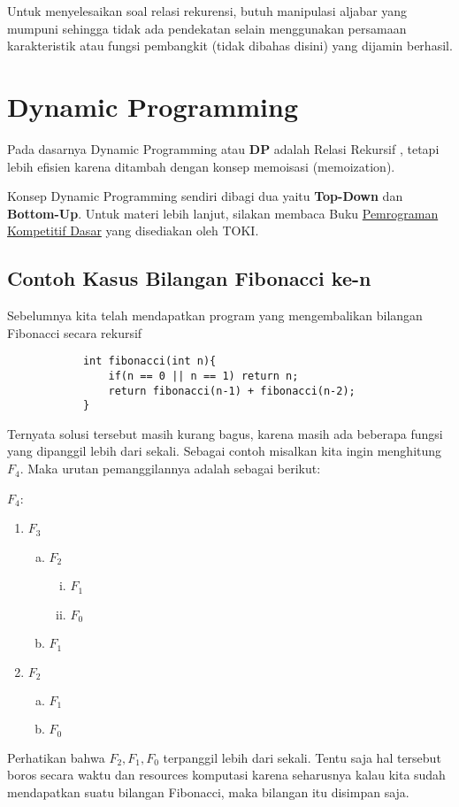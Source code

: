 \documentclass[11pt]{scrartcl}
\begin{document}
		    
		    Untuk menyelesaikan soal relasi rekurensi, butuh manipulasi aljabar yang mumpuni sehingga tidak ada pendekatan selain menggunakan persamaan karakteristik atau fungsi pembangkit (tidak dibahas disini) yang dijamin berhasil.
		    
		    
		    
		    \section{Dynamic Programming}
		    Pada dasarnya Dynamic Programming atau \textbf{DP} adalah Relasi Rekursif , tetapi lebih efisien karena ditambah dengan konsep memoisasi (memoization).
		    
		    Konsep Dynamic Programming sendiri dibagi dua yaitu \textbf{Top-Down} dan \textbf{Bottom-Up}. Untuk materi lebih lanjut, silakan membaca Buku \href{https://ksn.toki.id/data/pemrograman-kompetitif-dasar.pdf}{Pemrograman Kompetitif Dasar} yang disediakan oleh TOKI.
		    
		    \subsection{Contoh Kasus Bilangan Fibonacci ke-n}
		    Sebelumnya kita telah mendapatkan program yang mengembalikan bilangan Fibonacci secara rekursif 
		    \begin{lstlisting}
		    int fibonacci(int n){
		    	if(n == 0 || n == 1) return n;
		    	return fibonacci(n-1) + fibonacci(n-2);
		    }
		    \end{lstlisting}
		    Ternyata solusi tersebut masih kurang bagus, karena masih ada beberapa fungsi yang dipanggil lebih dari sekali. Sebagai contoh misalkan kita ingin menghitung $F_4$. Maka urutan pemanggilannya adalah sebagai berikut:
		    
		    $F_4$:
		    \begin{enumerate}
		    \item $F_3$
			    \begin{enumerate}[a)]
			    \item $F_2$
			    \begin{enumerate}[i)]
			    \item $F_1$
			    \item $F_0$
			    \end{enumerate}
			    \item $F_1$
			    \end{enumerate}
		    \item $F_2$
		    		\begin{enumerate}[a)]
		    	    \item $F_1$
		    	    \item $F_0$
		    	    \end{enumerate}
		    \end{enumerate}	
		    Perhatikan bahwa $F_2, F_1, F_0$ terpanggil lebih dari sekali. Tentu saja hal tersebut boros secara waktu dan resources komputasi karena seharusnya kalau kita sudah mendapatkan suatu bilangan Fibonacci, maka bilangan itu disimpan saja. 
		    
\end{document}
